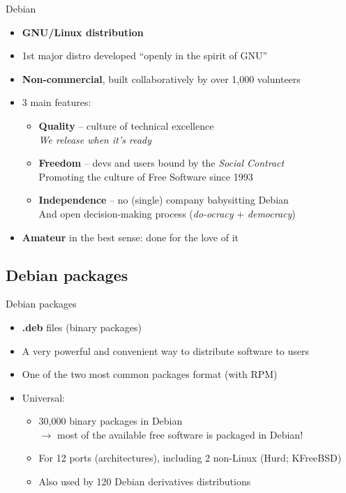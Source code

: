 \documentclass[10pt,final]{beamer}
\begin{document}
\begin{frame}{Debian}
	\begin{itemize}
		\item \textbf{GNU/Linux distribution}
			\br
		\item 1st major distro developed ``openly in the spirit of GNU''
			\br
		\item \textbf{Non-commercial}, built collaboratively by over 1,000 volunteers
			\br
		\item 3 main features:
			\begin{itemize}
				\item \textbf{Quality} -- culture of technical excellence\\
					{\small\sl We release when it's ready}
					\hbr
				\item \textbf{Freedom} -- devs and users bound by the \textsl{Social Contract}\\
					Promoting the culture of Free Software since 1993
					\hbr
				\item \textbf{Independence} -- no (single) company babysitting Debian\\
					And open decision-making process (\textsl{do-ocracy} + \textsl{democracy})
			\end{itemize}
                        \br
                \item \textbf{Amateur} in the best sense: done for the love of it
	\end{itemize}
\end{frame}

\subsection{Debian packages}
\begin{frame}{Debian packages}
\begin{itemize}
\item \textbf{.deb} files (binary packages)
	\br
\item A very powerful and convenient way to distribute software to users
	\br
\item One of the two most common packages format (with RPM)
	\br
\item Universal:
	\begin{itemize}
		\item 30,000 binary packages in Debian\\
			$\rightarrow$ most of the available free software is packaged in Debian!
			\hbr
		\item For 12 ports (architectures), including 2 non-Linux (Hurd; KFreeBSD)
			\hbr
		\item Also used by 120 Debian derivatives distributions
	\end{itemize}
\end{itemize}
\end{frame}
\end{document}
